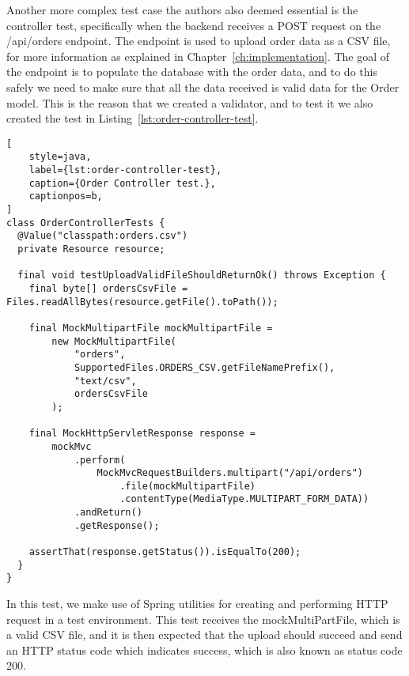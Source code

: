 Another more complex test case the authors also deemed essential is the controller test, specifically when
the backend receives a POST request on the /api/orders endpoint.
The endpoint is used to upload order data as a CSV file, for more information as explained in
Chapter~\ref{ch:implementation}.
The goal of the endpoint is to populate the database with the order data, and to do this safely we need
to make sure that all the data received is valid data for the Order model.
This is the reason that we created a validator, and to test it we also created the test in
Listing~\ref{lst:order-controller-test}.

\begin{lstlisting}[
    style=java,
    label={lst:order-controller-test},
    caption={Order Controller test.},
    captionpos=b,
]
class OrderControllerTests {
  @Value("classpath:orders.csv")
  private Resource resource;

  final void testUploadValidFileShouldReturnOk() throws Exception {
    final byte[] ordersCsvFile = Files.readAllBytes(resource.getFile().toPath());

    final MockMultipartFile mockMultipartFile =
        new MockMultipartFile(
            "orders",
            SupportedFiles.ORDERS_CSV.getFileNamePrefix(),
            "text/csv",
            ordersCsvFile
        );

    final MockHttpServletResponse response =
        mockMvc
            .perform(
                MockMvcRequestBuilders.multipart("/api/orders")
                    .file(mockMultipartFile)
                    .contentType(MediaType.MULTIPART_FORM_DATA))
            .andReturn()
            .getResponse();

    assertThat(response.getStatus()).isEqualTo(200);
  }
}
\end{lstlisting}

In this test, we make use of Spring utilities for creating and performing HTTP request in a test
environment.
This test receives the mockMultiPartFile, which is a valid CSV file, and it is then expected that the
upload should succeed and send an HTTP status code which indicates success,
which is also known as status code 200.
